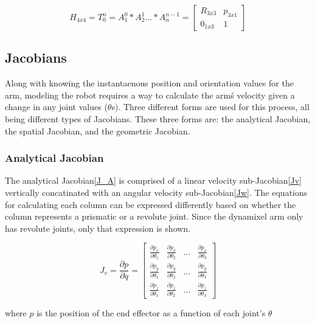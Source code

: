 \documentclass[10pt,journal]{IEEEtran}
\begin{document}
\begin{equation}\label{T_Matrix}
	H_{4x4}=T_0^n = A_1^0*A_2^1 \dots*A_n^{n-1} = 
		\begin{bmatrix}
			R_{3x3} & p_{3x1} \\
			0_{1x3} & 1
		\end{bmatrix}
\end{equation}

\subsection{Jacobians}
Along with knowing the instantaenous position and orientation
values for the arm, modeling the robot requires a way
to calculate the arm\'s velocity given a change in any joint
values ($\theta$s). Three different forms are used for this process,
all being different types of Jacobians. These three forms are:
the analytical Jacobian, the spatial Jacobian, and the geometric
Jacobian.

\subsubsection{Analytical Jacobian}
The analytical Jacobian\ref{J_A} is comprised of a linear velocity sub-Jacobian\ref{Jv} vertically concatinated with an angular velocity sub-Jacobian\ref{Jw}. The equations for calculating each column can be expressed differently based on whether the column represents a prismatic or a revolute joint. Since the dynamixel arm only has revolute joints, only that expression is shown.

\begin{mycapequ}[!ht]
\begin{equation}\label{Jv}
J_v = \frac{\partial p}{\partial q} = \begin{bmatrix} 
\frac{\partial p_x}{\partial \theta_1} & \frac{\partial p_x}{\partial \theta_2} & \dots & \frac{\partial p_x}{\partial \theta_3} \\
\frac{\partial p_y}{\partial \theta_1} & \frac{\partial p_y}{\partial \theta_2} & \dots & \frac{\partial p_y}{\partial \theta_3} \\
\frac{\partial p_z}{\partial \theta_1} & \frac{\partial p_z}{\partial \theta_2} & \dots & \frac{\partial p_z}{\partial \theta_3}
		\end{bmatrix} 
\end{equation}
\caption{where $p$ is the position of the end effector as a function of each joint's $\theta$}
\end{mycapequ}
\end{document}

